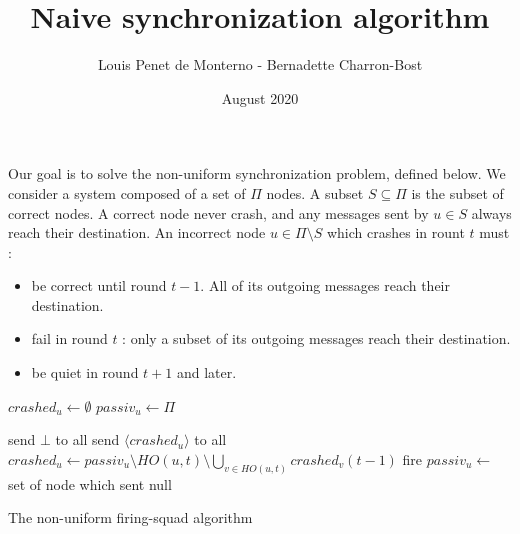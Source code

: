 \documentclass{article}
\title{Naive synchronization algorithm}
\date{August 2020}
\author{Louis Penet de Monterno - Bernadette Charron-Bost}
\begin{document}
Our goal is to solve the non-uniform synchronization problem, defined below.
We consider a system composed of a set of $\Pi$ nodes.
A subset $S \subseteq \Pi$ is the subset of correct nodes.
A correct node never crash, and any messages sent by $u \in S$ always reach their destination.
An incorrect node $u \in \Pi \setminus S$ which crashes in rount $t$ must :
\begin{itemize}
	\item be correct until round $t-1$. All of its outgoing messages reach their destination.
	\item fail in round $t$ : only a subset of its outgoing messages reach their destination.
	\item be quiet in round $t+1$ and later.
\end{itemize}



\begin{algorithm}[htb]\label{algo:code}
\begin{distribalgo}[1]
\BLANK {}
	\STATE $crashed_u \leftarrow \emptyset$
	\STATE $passiv_u \leftarrow \Pi$

\ENDINDENT \BLANK

			\STATE send $\bot$ to all
		\ELSE
			\STATE send $\langle crashed_u \rangle$ to all
		\ENDIF
	\ENDINDENT \BLANK
		\STATE $crashed_u \leftarrow passiv_u \setminus HO(u, t) \setminus \bigcup\limits_{v \in HO(u,t)} crashed_v(t-1)$ \label{line:detect}
			\STATE fire 
		\ENDIF
		\STATE $passiv_u \leftarrow $ set of node which sent null
	\ENDINDENT 
\ENDINDENT 

\caption{The non-uniform firing-squad algorithm} \label{algo:R}
\end{distribalgo}

\end{algorithm}
\end{document}
